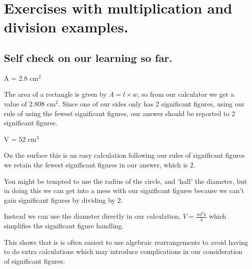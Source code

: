 \documentclass[
  letterpaper,
  DIV=11,
  numbers=noendperiod]{scrreprt}
\begin{document}
\section{Exercises with multiplication and division
examples.}\label{exercises-with-multiplication-and-division-examples.}

\subsection{Self check on our learning so
far.}\label{sec-SelfcheckSFmultdiv}

\begin{tcolorbox}[enhanced jigsaw, arc=.35mm, bottomrule=.15mm, bottomtitle=1mm, breakable, colback=white, colbacktitle=quarto-callout-note-color!10!white, colframe=quarto-callout-note-color-frame, coltitle=black, left=2mm, leftrule=.75mm, opacityback=0, opacitybacktitle=0.6, rightrule=.15mm, title=\textcolor{quarto-callout-note-color}{\faInfo}\hspace{0.5em}{If each side of a rectangle was measured to be 2.34 cm and 1.2 cm, what
is the area?}, titlerule=0mm, toprule=.15mm, toptitle=1mm]

A = 2.8 cm\(^2\)

The area of a rectangle is given by \(A = l \times w\), so from our
calculator we get a value of 2.808 cm\(^2\). Since one of our sides only
has 2 significant figures, using our rule of using the fewest
significant figures, our answer should be reported to 2 significant
figures.

\end{tcolorbox}

\begin{tcolorbox}[enhanced jigsaw, arc=.35mm, bottomrule=.15mm, bottomtitle=1mm, breakable, colback=white, colbacktitle=quarto-callout-note-color!10!white, colframe=quarto-callout-note-color-frame, coltitle=black, left=2mm, leftrule=.75mm, opacityback=0, opacitybacktitle=0.6, rightrule=.15mm, title=\textcolor{quarto-callout-note-color}{\faInfo}\hspace{0.5em}{What is the volume of a cylinder with a diameter of 2.3 cm and a height
of 12.4 cm?}, titlerule=0mm, toprule=.15mm, toptitle=1mm]

V = 52 cm\(^3\)

On the surface this is an easy calculation following our rules of
significant figures we retain the fewest significant figures in our
answer, which is 2.

You might be tempted to use the radius of the circle, and `half' the
diameter, but in doing this we can get into a mess with our significant
figures because we can't gain significant figures by dividing by 2.

Instead we can use the diameter directly in our calculation,
\(V = \frac{\pi d^2 h}{4}\) which simplifies the significant figure
handling.

This shows that is is often easiest to use algebraic rearrangements to
avoid having to do extra calculations which may introduce complications
in our consideration of significant figures.

\end{tcolorbox}
\end{document}
